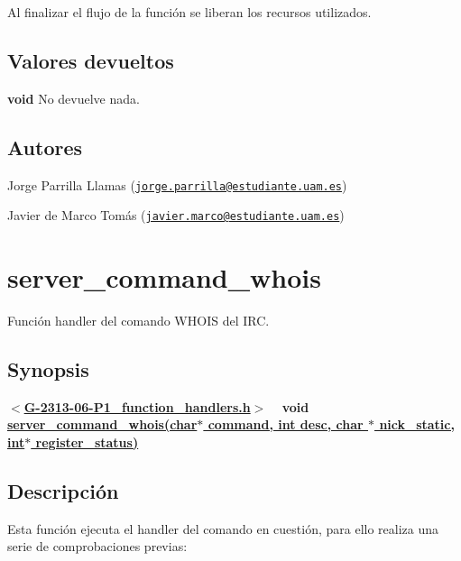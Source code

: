 Al finalizar el flujo de la función se liberan los recursos utilizados.\hypertarget{server_command_away_return_away}{}\subsection{Valores devueltos}\label{server_command_away_return_away}

\begin{DoxyItemize}
\item {\bfseries void} No devuelve nada. 
\end{DoxyItemize}\hypertarget{server_command_away_authors_away}{}\subsection{Autores}\label{server_command_away_authors_away}

\begin{DoxyItemize}
\item Jorge Parrilla Llamas (\href{mailto:jorge.parrilla@estudiante.uam.es}{\tt jorge.\+parrilla@estudiante.\+uam.\+es}) 
\item Javier de Marco Tomás (\href{mailto:javier.marco@estudiante.uam.es}{\tt javier.\+marco@estudiante.\+uam.\+es}) 
\end{DoxyItemize}\hypertarget{server_command_whois}{}\section{server\+\_\+command\+\_\+whois}\label{server_command_whois}
Función handler del comando W\+H\+O\+IS del I\+RC.\hypertarget{server_command_whois_synopsis_whois}{}\subsection{Synopsis}\label{server_command_whois_synopsis_whois}
{ {\bfseries $<$\hyperlink{G-2313-06-P1__function__handlers_8h}{G-\/2313-\/06-\/\+P1\+\_\+function\+\_\+handlers.\+h}$>$} ~\newline
 {\bfseries void \hyperlink{G-2313-06-P1__function__handlers_8c_a8bb934f01707fcb12ebac41f1fe69441}{server\+\_\+command\+\_\+whois(char$\ast$ command, int desc, char $\ast$ nick\+\_\+static, int$\ast$ register\+\_\+status)}} } \hypertarget{server_command_whois_descripcion_whois}{}\subsection{Descripción}\label{server_command_whois_descripcion_whois}
Esta función ejecuta el handler del comando en cuestión, para ello realiza una serie de comprobaciones previas\+:


